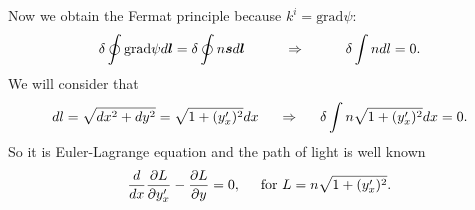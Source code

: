Now we obtain the Fermat principle because $k^i = \text{grad} \psi$:
\begin{equation*}
	\delta \oint \text{grad} \psi d \mbox{\boldmath $l$} = \delta \oint n \mbox{\boldmath $s$} d \mbox{\boldmath $l$} \hspace{1 cm}
	\Rightarrow
	\hspace{1 cm}
	\delta \int n d l = 0.
\end{equation*}
We will consider that 
\begin{equation*}
	d l = \sqrt{ d x^2 + d y^2} = \sqrt{1 + (y_x')^2}d x
	\hspace{0.5 cm}
	\Rightarrow
	\hspace{0.5 cm}
	\delta \int n \sqrt{1 + (y_x')^2}d x = 0.
\end{equation*}
So it is Euler-Lagrange equation and the path of light is well known
\begin{equation*}
	\frac{d}{d x} \frac{\partial L}{\partial y_x'} - \frac{\partial L}{\partial y} = 0,
	\hspace{0.5 cm}
	\text{for } L = n \sqrt{1 + (y_x')^2}.
\end{equation*}